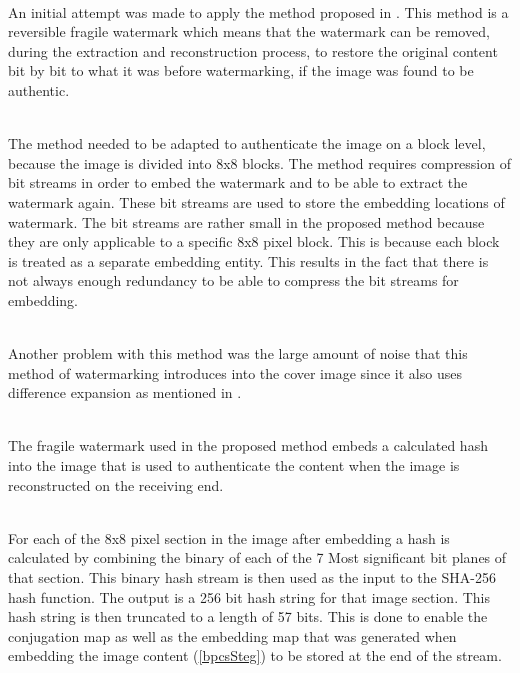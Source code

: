 \documentclass[12pt]{article}
\begin{document}
\hspace{0pt} \\
An initial attempt was made to apply the method proposed in \cite{tian2002wavelet}.
This method is a reversible fragile watermark which means that the watermark can be removed, during the extraction and reconstruction process, to restore the original content bit by bit to what it was before watermarking, if the image was found to be authentic.

\hspace{0pt} \\
The method needed to be adapted to authenticate the image on a block level, because the image is divided into 8x8 blocks.
The method requires compression of bit streams in order to embed the watermark and to be able to extract the watermark again.
These bit streams are used to store the embedding locations of watermark.
The bit streams are rather small in the proposed method because they are only applicable to a specific 8x8 pixel block. 
This is because each block is treated as a separate embedding entity.
This results in the fact that there is not always enough redundancy to be able to compress the bit streams for embedding.

\hspace{0pt} \\
Another problem with this method was the large amount of noise that this method of watermarking introduces into the cover image since it also uses difference expansion as mentioned in \cite{tian2002reversible}.

\hspace{0pt} \\
The fragile watermark used in the proposed method embeds a calculated hash into the image that is used to authenticate the content when the image is reconstructed on the receiving end.

\hspace{0pt} \\
For each of the 8x8 pixel section in the image after embedding a hash is calculated by combining the binary of each of the 7 Most significant bit planes of that section. This binary hash stream is then used as the input to the SHA-256 hash function.
The output is a 256 bit hash string for that image section.
This hash string is then truncated to a length of 57 bits.
This is done to enable the conjugation map as well as the embedding map that was generated when embedding the image content (\ref{bpcsSteg}) to be stored at the end of the stream.
\end{document}
